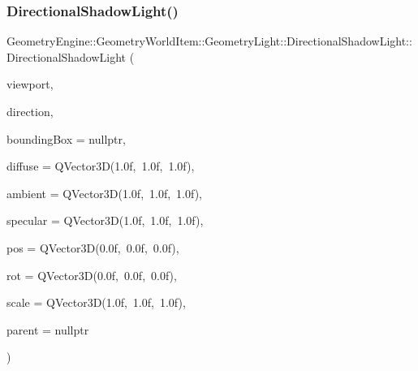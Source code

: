 \subsubsection{\texorpdfstring{DirectionalShadowLight()}{DirectionalShadowLight()}\hspace{0.1cm}{\footnotesize\ttfamily [1/2]}}
{\footnotesize\ttfamily Geometry\+Engine\+::\+Geometry\+World\+Item\+::\+Geometry\+Light\+::\+Directional\+Shadow\+Light\+::\+Directional\+Shadow\+Light (\begin{DoxyParamCaption}\item[{const \mbox{\hyperlink{class_geometry_engine_1_1_geometry_item_utils_1_1_viewport}{Geometry\+Item\+Utils\+::\+Viewport}} \&}]{viewport,  }\item[{const Q\+Vector3D \&}]{direction,  }\item[{\mbox{\hyperlink{class_geometry_engine_1_1_geometry_world_item_1_1_geometry_item_1_1_geometry_item}{Geometry\+Item\+::\+Geometry\+Item}} $\ast$}]{bounding\+Box = {\ttfamily nullptr},  }\item[{const Q\+Vector3D \&}]{diffuse = {\ttfamily QVector3D(1.0f,~1.0f,~1.0f)},  }\item[{const Q\+Vector3D \&}]{ambient = {\ttfamily QVector3D(1.0f,~1.0f,~1.0f)},  }\item[{const Q\+Vector3D \&}]{specular = {\ttfamily QVector3D(1.0f,~1.0f,~1.0f)},  }\item[{const Q\+Vector3D \&}]{pos = {\ttfamily QVector3D(0.0f,~0.0f,~0.0f)},  }\item[{const Q\+Vector3D \&}]{rot = {\ttfamily QVector3D(0.0f,~0.0f,~0.0f)},  }\item[{const Q\+Vector3D \&}]{scale = {\ttfamily QVector3D(1.0f,~1.0f,~1.0f)},  }\item[{\mbox{\hyperlink{class_geometry_engine_1_1_geometry_world_item_1_1_world_item}{World\+Item}} $\ast$}]{parent = {\ttfamily nullptr} }\end{DoxyParamCaption})}

